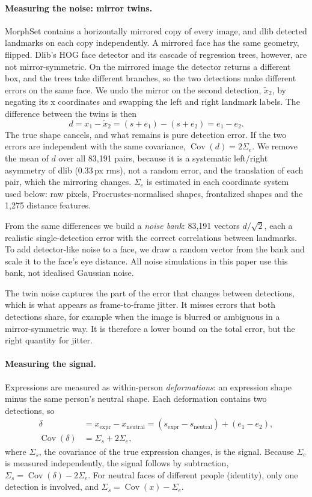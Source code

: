 \documentclass[11pt,a4paper]{article}
\newcommand{\Cov}{\operatorname{Cov}}
\begin{document}
\paragraph{Measuring the noise: mirror twins.} MorphSet contains a horizontally mirrored copy of
every image, and dlib detected landmarks on each copy independently. A mirrored face has the same
geometry, flipped. Dlib's HOG face detector and its cascade of regression trees, however, are not
mirror-symmetric. On the mirrored image the detector returns a different box, and the trees take
different branches, so the two detections make different errors on the same face. We undo the
mirror on the second detection, $\tilde x_2$, by negating its x coordinates and swapping the left
and right landmark labels. The difference between the twins is then
\begin{equation}
  d = x_1 - \tilde x_2 = (s + e_1) - (s + e_2) = e_1 - e_2 .
\end{equation}
The true shape cancels, and what remains is pure detection error. If the two errors are
independent with the same covariance, $\Cov(d) = 2\Sigma_e$. We remove the mean of $d$ over all
83,191 pairs, because it is a systematic left/right asymmetry of dlib (0.33\,px rms), not a random
error, and the translation of each pair, which the mirroring changes. $\Sigma_e$ is estimated in
each coordinate system used below: raw pixels, Procrustes-normalised shapes, frontalized shapes
and the 1,275 distance features.

From the same differences we build a \emph{noise bank}: 83,191 vectors $d/\sqrt{2}$, each a
realistic single-detection error with the correct correlations between landmarks. To add
detector-like noise to a face, we draw a random vector from the bank and scale it to the face's
eye distance. All noise simulations in this paper use this bank, not idealised Gaussian noise.

The twin noise captures the part of the error that changes between detections, which is what
appears as frame-to-frame jitter. It misses errors that both detections share, for example when
the image is blurred or ambiguous in a mirror-symmetric way. It is therefore a lower bound on the
total error, but the right quantity for jitter.

\paragraph{Measuring the signal.} Expressions are measured as within-person \emph{deformations}:
an expression shape minus the same person's neutral shape. Each deformation contains two
detections, so
\begin{align}
  \delta &= x_{\text{expr}} - x_{\text{neutral}}
          = (s_{\text{expr}} - s_{\text{neutral}}) + (e_1 - e_2), \\
  \Cov(\delta) &= \Sigma_s + 2\Sigma_e ,
\end{align}
where $\Sigma_s$, the covariance of the true expression changes, is the signal. Because $\Sigma_e$
is measured independently, the signal follows by subtraction,
$\Sigma_s = \Cov(\delta) - 2\Sigma_e$. For neutral faces of different people (identity), only one
detection is involved, and $\Sigma_s = \Cov(x) - \Sigma_e$.
\end{document}
